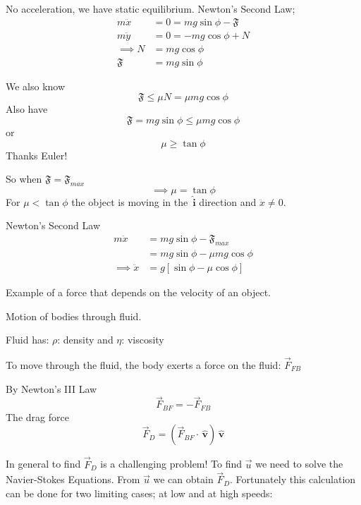 \documentclass[twoside]{scrartcl}
\let\oldhat\hat
\renewcommand{\hat}[1]{\,\oldhat{\boldsymbol{\mathbf{#1}}}}
\begin{document}
\begin{example}
No acceleration, we have static equilibrium. Newton's Second Law;
\begin{align*}
m\ddot{x} &= 0 = mg\sin\phi - \mathfrak{F} \tag{i}\\	
m\ddot{y} &= 0 = -mg\cos\phi + N \tag{ii}\\
\implies N &= mg\cos\phi\\
 \mathfrak{F} &= mg\sin\phi 
\end{align*}

We also know 
\[\mathfrak{F} \leq \mu N = \mu mg\cos\phi\]
Also have 
\[\mathfrak{F} = mg\sin\phi \leq \mu mg \cos\phi\]
or 
\[\mu \geq \tan\phi\] 
Thanks Euler!

So when $\mathfrak{F} = \mathfrak{F}_{max}$
\[\implies \mu = \tan\phi\]
For $\mu < \tan\phi$ the object is moving in the $\hat{i}$ direction and $\ddot{x} \neq 0$. 

Newton's Second Law
\[
\begin{aligned}
m\ddot{x} &= mg\sin\phi - \mathfrak{F}_{max}\\
&= mg\sin\phi - \mu mg\cos\phi \\
\implies \ddot{x} &= g[\sin\phi - \mu\cos\phi]	
\end{aligned}
\]
\end{example}


Example  of a force that depends on the velocity of an object. 

Motion of bodies through fluid. 
\begin{center}
\end{center}

Fluid has: $\rho$: density and $\eta$: viscosity

To move through the fluid, the body exerts a force on the fluid: $\vec{F}_{FB}$

By Newton's III Law
\[\vec{F}_{BF} = -\vec{F}_{FB}\]
The drag force \[\vec{F}_D = (\vec{F}_{BF}\cdot \hat{v})\hat{v}\]

In general to find $\vec{F}_{D}$ is a challenging problem! To find $\vec{u}$ we need to solve the Navier-Stokes Equations. From $\vec{u}$ we can obtain $\vec{F}_D$. Fortunately this calculation can be done for two limiting cases; at low and at high speeds:
\end{document}
